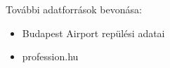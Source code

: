 További adatforrások bevonása:
\begin{itemize}
    \item Budapest Airport repülési adatai
    \item profession.hu
\end{itemize}
